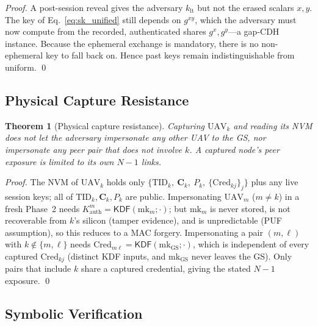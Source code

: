 \documentclass[11pt,a4paper]{article}
\newtheorem{theorem}{Theorem}
\begin{document}
\begin{proof}
A post-session reveal gives the adversary $k_{\text{lt}}$ but not the erased
scalars $x,y$. The key of Eq.~\eqref{eq:sk_unified} still depends on $g^{xy}$,
which the adversary must now compute from the recorded, authenticated shares
$g^{x},g^{y}$---a gap-CDH instance. Because the ephemeral exchange is mandatory,
there is no non-ephemeral key to fall back on. Hence past keys remain
indistinguishable from uniform. \qed
\end{proof}

\subsection{Physical Capture Resistance}

\begin{theorem}[Physical capture resistance]
\label{thm:capture}
Capturing $\text{UAV}_k$ and reading its NVM does not let the adversary
impersonate any other UAV to the GS, nor impersonate any peer pair that does not
involve $k$. A captured node's peer exposure is limited to its own $N-1$ links.
\end{theorem}

\begin{proof}
The NVM of $\text{UAV}_k$ holds only $\{\text{TID}_k,\ \bm{C}_k,\ P_k,\ \{\text{Cred}_{kj}\}_j\}$
plus any live session keys; all of $\text{TID}_k,\bm{C}_k,P_k$ are public.
Impersonating $\text{UAV}_m$ ($m\neq k$) in a fresh Phase~2 needs
$K^{m}_{\text{auth}}=\mathsf{KDF}(\text{mk}_m;\cdot)$; but $\text{mk}_m$ is never
stored, is not recoverable from $k$'s silicon (tamper evidence), and is
unpredictable (PUF assumption), so this reduces to a MAC forgery. Impersonating
a pair $(m,\ell)$ with $k\notin\{m,\ell\}$ needs
$\text{Cred}_{m\ell}=\mathsf{KDF}(\text{mk}_{\text{GS}};\cdot)$, which is
independent of every captured $\text{Cred}_{kj}$ (distinct KDF inputs, and
$\text{mk}_{\text{GS}}$ never leaves the GS). Only pairs that include $k$ share a
captured credential, giving the stated $N-1$ exposure. \qed
\end{proof}

\subsection{Symbolic Verification}
\label{subsec:symbolic}
\end{document}
